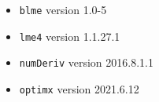 \documentclass[11pt, a4paper]{article}
\newcommand{\PS}[1]{{\noindent \color{red} \bf \#PS: #1}}
\theoremstyle{example} \newtheorem{example}{Example}[section]
\theoremstyle{theorem} \newtheorem{theorem}{Theorem}[section]
\theoremstyle{theorem }\newtheorem{proposition}{Proposition}[section]
\theoremstyle{theorem }\newtheorem{corollary}{Corollary}[section]
\begin{document}
	\begin{itemize}
		\item \texttt{blme} \citep{chung+etal:2013} version 1.0-5 
		\item \texttt{lme4} \citep{bates+etal:2015} version 1.1.27.1
		\item \texttt{numDeriv} \citep{gilbert+varadhan:2019} version 2016.8.1.1
		\item \texttt{optimx} \citep{nash+varadhan:2011} version 2021.6.12
	\end{itemize}
\newpage
\end{document}
